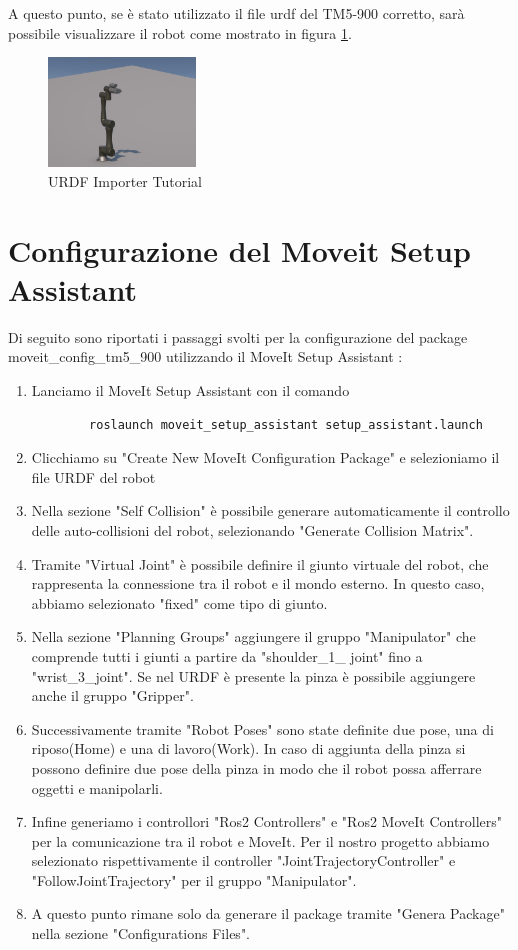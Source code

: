 \documentclass[11pt]{report}
\begin{document}
A questo punto, se è stato utilizzato il file urdf del TM5-900 corretto, sarà possibile visualizzare il robot come mostrato in figura \ref{fig:URDF_Importer_7}.
\begin{figure}[H]
    \centering
    \includegraphics[width=0.35\textwidth]{images/URDF_Importer_7.png}
    \caption{URDF Importer Tutorial}
    \label{fig:URDF_Importer_7}     
\end{figure}

\section{Configurazione del Moveit Setup Assistant}
\label{sec:moveit_setup_assistant}
Di seguito sono riportati i passaggi svolti per la configurazione del package moveit\_config\_tm5\_900 utilizzando il MoveIt Setup Assistant \cite{Moveit_tutorial}: 
\begin{enumerate}
    \item Lanciamo il MoveIt Setup Assistant con il comando \begin{verbatim}
        roslaunch moveit_setup_assistant setup_assistant.launch
    \end{verbatim}
    \item Clicchiamo su "Create New MoveIt Configuration Package" e selezioniamo il file URDF del robot
    \item Nella sezione "Self Collision" è possibile generare automaticamente il controllo delle auto-collisioni del robot, selezionando "Generate Collision Matrix".
    \item Tramite "Virtual Joint" è possibile definire il giunto virtuale del robot, che rappresenta la connessione tra il robot e il mondo esterno. In questo caso, abbiamo selezionato "fixed" come tipo di giunto.
    \item Nella sezione "Planning Groups" aggiungere il gruppo "Manipulator" che comprende tutti i giunti a partire da "shoulder\_1\_ joint" fino a "wrist\_3\_joint". Se nel URDF è presente la pinza è possibile aggiungere anche il gruppo "Gripper".
    \item Successivamente tramite "Robot Poses" sono state definite due pose, una di riposo(Home) e una di lavoro(Work). In caso di aggiunta della pinza si possono definire due pose della pinza in modo che il robot possa afferrare oggetti e manipolarli.
    \item Infine generiamo i controllori "Ros2 Controllers" e "Ros2 MoveIt Controllers" per la comunicazione tra il robot e MoveIt. Per il nostro progetto abbiamo selezionato rispettivamente il controller "JointTrajectoryController" e "FollowJointTrajectory" per il gruppo "Manipulator".
    \item A questo punto rimane solo da generare il package tramite "Genera Package" nella sezione "Configurations Files".
\end{enumerate}
\end{document}
